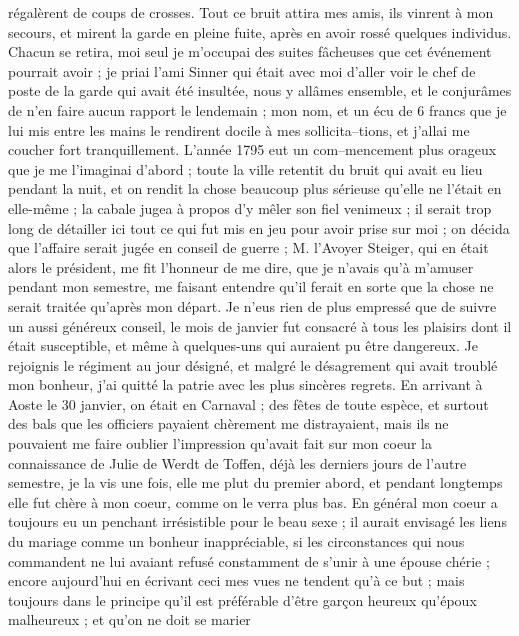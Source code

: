 \documentclass[12pt]{article}
\begin{document}
 régalèrent de coups de crosses. Tout ce bruit attira mes
amis, ils vinrent à mon secours, et mirent la garde en pleine fuite, après en avoir rossé quelques
individus. Chacun se retira, moi seul je m’occupai des suites fâcheuses que cet événement pourrait
avoir ; je priai l’ami Sinner qui était avec moi d’aller voir le chef de poste de la garde qui avait
été insultée, nous y allâmes ensemble, et le conjurâmes de n’en faire aucun rapport le lendemain ;
mon nom, et un écu de 6 francs que je lui mis entre les mains le rendirent docile à mes
sollicita–tions, et j’allai me coucher fort tranquillement. L’année 1795 eut un com–mencement plus
orageux que je me l’imaginai d’abord ; toute la ville retentit du bruit qui avait eu lieu pendant la
nuit, et on rendit la chose beaucoup plus sérieuse qu’elle ne l’était en elle-même ; la cabale jugea
à propos d’y mêler son fiel venimeux ; il serait trop long de détailler ici tout ce qui fut mis en
jeu pour avoir prise sur moi ; on décida que l’affaire serait jugée en conseil de guerre ; M.
l’Avoyer Steiger, qui en était alors le président, me fit l’honneur de me dire, que je n’avais qu’à
m’amuser pendant mon semestre, me faisant entendre qu’il ferait en sorte que la chose ne serait
traitée qu’après mon départ. Je n’eus rien de plus empressé que de suivre un aussi généreux conseil,
le mois de janvier fut consacré à tous les plaisirs dont il était susceptible, et même à
quelques-uns qui auraient pu être dangereux. Je rejoignis le régiment au jour désigné, et malgré le
désagrement qui avait troublé mon bonheur, j’ai quitté la patrie avec les plus sincères regrets. En
arrivant à Aoste le 30 janvier, on était en Carnaval ; des fêtes de toute espèce, et surtout des
bals que les officiers payaient chèrement me distrayaient, mais ils ne pouvaient me faire oublier
l’impression qu’avait fait sur mon coeur la connaissance de Julie de Werdt de Toffen, déjà les
derniers jours de l’autre semestre, je la vis une fois, elle me plut du premier abord, et pendant
longtemps elle fut chère à mon coeur, comme on le verra plus bas. En général mon coeur a toujours eu
un penchant irrésistible pour le beau sexe ; il aurait envisagé les liens du mariage comme un
bonheur inappréciable, si les circonstances qui nous commandent ne lui avaiant refusé constamment de
s’unir à une épouse chérie ; encore aujourd’hui en écrivant ceci mes vues ne tendent qu’à ce but ;
mais toujours dans le principe qu’il est préférable d’être garçon heureux qu’époux malheureux ; et
qu’on ne doit se marier
\end{document}
